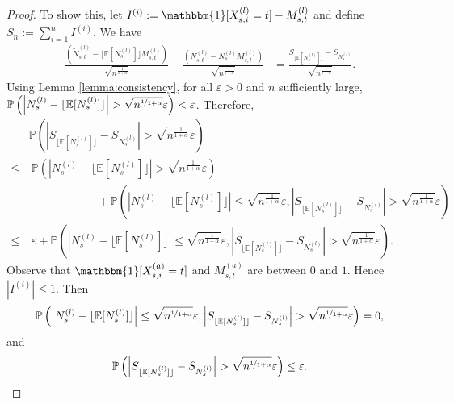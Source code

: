 \documentclass[twoside,11pt]{article}
\newcommand{\pow}[1]{^{(#1)}}%
\numberwithin{equation}{section}
\newcommand{\lp}{\left(}
\newcommand{\rp}{\right)}
\newcommand{\lv}{\left|}
\newcommand{\rv}{\right|}
\newcommand{\Pbb}{\mathbb{P}}
\newcommand{\prob}{\Pbb}
\newcommand{\expec}{\mathbb{E}}
\newcommand{\indicator}{\mathbbm{1}}
\newcommand{\eps}{\varepsilon}
\renewcommand{\epsilon}{\eps}
\begin{document}
\begin{proof}
    To show this, let $I\pow i:= \indicator[X_{s,i}\pow l=t]-M_{s,t}\pow l$ and define $S_n := \sum_{i=1}^n I\pow i$. We have
    \begin{align*}
       \frac{\lp\tilde N_{s,t}\pow l - \lfloor \expec[N_s \pow l]\rfloor M_{s,t}\pow l \rp}{\sqrt{n^{\frac{1}{1+\alpha}}}} - \frac{\lp{ N_{s,t}\pow l-N_{s}\pow l M_{s,t}\pow l}\rp}{\sqrt{n^{\frac{1}{1+\alpha}}}} & =  \frac{S_{\lfloor \expec[N_s \pow l] \rfloor}-S_{N_s \pow l}}{\sqrt{n^{\frac{1}{1+\alpha}}}}.
    \end{align*}
    Using Lemma \ref{lemma:consistency}, for all $\eps>0$ and $n$ sufficiently large, $\prob\lp \lv N_s \pow l -\lfloor \expec[N_s \pow l] \rfloor \rv> \sqrt{n^{\nicefrac{1}{1+\alpha}}}\epsilon\rp<\eps$. Therefore,
    \begin{align*}
    & \prob\lp \left| S_{\lfloor \expec[N_s \pow l] \rfloor} - S_{N_s \pow l} \right| > \sqrt{n^{\frac{1}{1+\alpha}}} \epsilon \rp \\
    \leq & \ \prob\lp \left| N_s \pow l - \lfloor \expec[N_s \pow l] \rfloor \right| > \sqrt{n^{\frac{1}{1+\alpha}}} \epsilon \rp
    \\ & \hspace{1in} + \prob\lp \left| N_s \pow l - \lfloor \expec[N_s \pow l] \rfloor \right| \leq \sqrt{n^{\frac{1}{1+\alpha}}} \epsilon, \left| S_{\lfloor \expec[N_s \pow l] \rfloor} - S_{N_s \pow l} \right| > \sqrt{n^{\frac{1}{1+\alpha}}} \epsilon \rp \\
    \leq & \ \epsilon + \prob\lp \left| N_s \pow l - \lfloor \expec[N_s \pow l] \rfloor \right| \leq \sqrt{n^{\frac{1}{1+\alpha}}} \epsilon, \left| S_{\lfloor \expec[N_s \pow l] \rfloor} - S_{N_s \pow l} \right| > \sqrt{n^{\frac{1}{1+\alpha}}} \epsilon \rp.
    \end{align*}
    Observe that $\indicator[X_{s,i}\pow a=t]$ and $M_{s,t}\pow a$ are between $0$ and $1$. Hence $\lv I \pow i\rv \leq 1$. Then 
    \[
    \prob\lp \left| N_s \pow l - \lfloor \expec[N_s \pow l] \rfloor \right| \leq \sqrt{n^{\nicefrac{1}{1+\alpha}}} \epsilon, \left| S_{\lfloor \expec[N_s \pow l] \rfloor} - S_{N_s \pow l} \right| > \sqrt{n^{\nicefrac{1}{1+\alpha}}} \epsilon \rp = 0,\] and 
    \[
    \prob\lp \left| S_{\lfloor \expec[N_s \pow l] \rfloor} - S_{N_s \pow l} \right| > \sqrt{n^{\nicefrac{1}{1+\alpha}}} \epsilon \rp \leq \epsilon.\] 

\end{proof}
\end{document}
